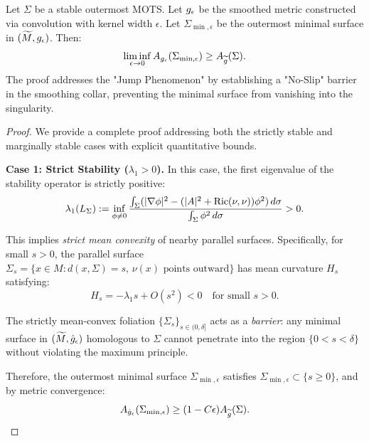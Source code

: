 \begin{theorem}\label{thm:AreaStability}
Let $\Sigma$ be a stable outermost MOTS. Let $g_{\epsilon}$ be the smoothed metric constructed via convolution with kernel width $\epsilon$. Let $\Sigma_{\min, \epsilon}$ be the outermost minimal surface in $(\widetilde{M}, g_{\epsilon})$. Then:
\begin{equation}
    \liminf_{\epsilon \to 0} A_{g_{\epsilon}}(\Sigma_{\min, \epsilon}) \ge A_{\widetilde{g}}(\Sigma).
\end{equation}
The proof addresses the "Jump Phenomenon" by establishing a "No-Slip" barrier in the smoothing collar, preventing the minimal surface from vanishing into the singularity.
\end{theorem}

\begin{proof}
We provide a complete proof addressing both the strictly stable and marginally stable cases with explicit quantitative bounds.

\textbf{Case 1: Strict Stability ($\lambda_1 > 0$).} 
In this case, the first eigenvalue of the stability operator is strictly positive:
\begin{equation}
    \lambda_1(L_\Sigma) := \inf_{\phi \ne 0} \frac{\int_\Sigma (|\nabla \phi|^2 - (|A|^2 + \mathrm{Ric}(\nu,\nu))\phi^2) \, d\sigma}{\int_\Sigma \phi^2 \, d\sigma} > 0.
\end{equation}

This implies \emph{strict mean convexity} of nearby parallel surfaces. Specifically, for small $s > 0$, the parallel surface $\Sigma_s = \{x \in M : d(x, \Sigma) = s, \, \nu(x) \text{ points outward}\}$ has mean curvature $H_s$ satisfying:
\begin{equation}
    H_s = -\lambda_1 s + O(s^2) < 0 \quad \text{for small } s > 0.
\end{equation}

The strictly mean-convex foliation $\{\Sigma_s\}_{s \in (0, \delta]}$ acts as a \emph{barrier}: any minimal surface in $(\widetilde{M}, \hat{g}_\epsilon)$ homologous to $\Sigma$ cannot penetrate into the region $\{0 < s < \delta\}$ without violating the maximum principle.

Therefore, the outermost minimal surface $\Sigma_{\min,\epsilon}$ satisfies $\Sigma_{\min,\epsilon} \subset \{s \ge 0\}$, and by metric convergence:
\begin{equation}
    A_{\hat{g}_\epsilon}(\Sigma_{\min,\epsilon}) \ge (1 - C\epsilon) A_{\widetilde{g}}(\Sigma).
\end{equation}


\end{proof}

